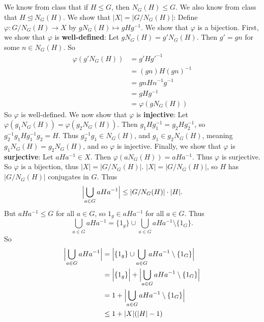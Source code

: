 \documentclass[11pt]{article}
\begin{document}
\subsection{} %
We know from class that if $H\le G$, then $N_G(H)\le G$. We also know from
class that $H\trianglelefteq N_G(H)$.
\newline
\newline
We show that $|X|=|G/N_G(H)|$:
\newline
Define $\varphi:G/N_G(H)\longrightarrow X$ by $gN_G(H)\longmapsto gHg^{-1}$. We
show that $\varphi$ is a bijection.
\newline
\newline
First, we show that $\varphi$ is \textbf{well-defined}:
\newline
Let $gN_G(H)=g'N_G(H)$. Then $g'=gn$ for some $n\in N_G(H)$. So
\begin{align*}
	\varphi(g'N_G(H))&=g'Hg'^{-1}\\
	&=(gn)H(gn)^{-1}\\
	&=gnHn^{-1}g^{-1}\\
	&=gHg^{-1}\\
	&=\varphi(gN_G(H))
\end{align*}
So $\varphi$ is well-defined.
\newline
\newline
We now show that $\varphi$ is \textbf{injective}:
\newline
Let $\varphi(g_1N_G(H))=\varphi(g_2N_G(H))$. Then
$g_1Hg_1^{-1}=g_2Hg_2^{-1}$, so $g_2^{-1}g_1Hg_1^{-1}g_2=H$. Thus
$g_2^{-1}g_1\in N_G(H)$, and $g_1\in g_2N_G(H)$, meaning $g_1N_G(H)=g_2N_G(H)$,
and so $\varphi$ is injective.
\newline
\newline
Finally, we show that $\varphi$ is \textbf{surjective}:
\newline
Let $aHa^{-1}\in X$. Then $\varphi(aN_G(H))=aHa^{-1}$. Thus $\varphi$ is
surjective. So $\varphi$ is a bijection, thus $|X|=|G/N_G(H)|$.
\newline
\newline
$|X|=|G/N_G(H)|$, so $H$ has $|G/N_G(H)|$ conjugates in $G$. Thus
\[\Bigl|\bigcup_{a\in G}aHa^{-1}\Bigr|\le|G/N_G(H)|\cdot|H|.\]
But $aHa^{-1}\le G$ for all $a\in G$, so $1_g\in aHa^{-1}$ for all $a\in G$.
Thus
\[\bigcup_{a\in G}aHa^{-1}=\{1_g\}\cup\bigcup_{a\in G}aHa^{-1}\setminus\{1_G\}.\]
So
\begin{align*}
	\Bigl|\bigcup_{a\in G}aHa^{-1}\Bigr|&=\Bigl|\{1_g\}\cup\bigcup_{a\in G}aHa^{-1}\setminus\{1_G\}\Bigr|\\
	&=\Bigl|\{1_g\}\Bigr|+\Bigl|\bigcup_{a\in G}aHa^{-1}\setminus\{1_G\}\Bigr|\\
	&=1+\Bigl|\bigcup_{a\in G}aHa^{-1}\setminus\{1_G\}\Bigr|\\
	&\le1+|X|(|H|-1)
\end{align*}
\end{document}
